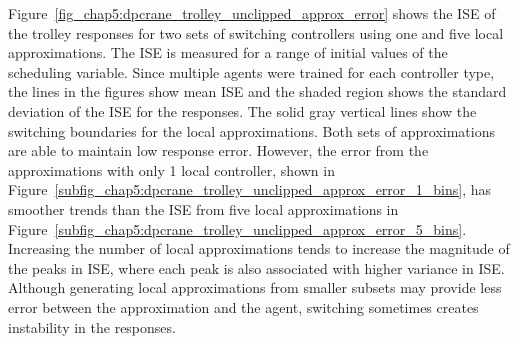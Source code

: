 %
Figure~\ref{fig_chap5:dpcrane_trolley_unclipped_approx_error} shows the ISE of the trolley responses for two sets of switching controllers using one and five local approximations.
The ISE is measured for a range of initial values of the scheduling variable. Since multiple agents were trained for each controller type, the lines in the figures show mean ISE and the shaded region shows the standard deviation of the ISE for the responses. The solid gray vertical lines show the switching boundaries for the local approximations.
%
Both sets of approximations are able to maintain low response error. However, the error from the approximations with only 1 local controller, shown in Figure~\ref{subfig_chap5:dpcrane_trolley_unclipped_approx_error_1_bins}, has smoother trends than the ISE from five local approximations in Figure~\ref{subfig_chap5:dpcrane_trolley_unclipped_approx_error_5_bins}. Increasing the number of local approximations tends to increase the magnitude of the peaks in ISE, where each peak is also associated with higher variance in ISE. Although generating local approximations from smaller subsets may provide less error between the approximation and the agent, switching sometimes creates instability in the responses.
%
